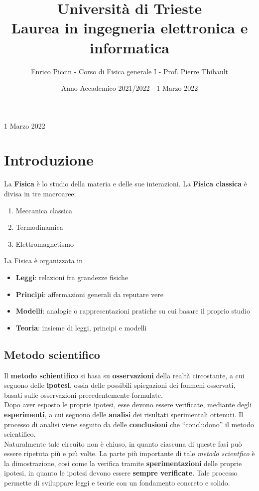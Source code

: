 \documentclass[a4paper]{extarticle}
\title{\textbf{Università di Trieste\\ \vspace{1em}
Laurea in ingegneria elettronica e informatica}}
\author{Enrico Piccin - Corso di Fisica generale I - Prof. Pierre Thibault}
\date{Anno Accademico 2021/2022 - 1 Marzo 2022}
\newcommand{\quotes}[1]{``#1''}
\begin{document}
\vspace{-10mm}
\maketitle

\tableofcontents
\newpage

\noindent
\begin{center}
  1 Marzo 2022
\end{center}

\section{Introduzione}
La \textbf{Fisica} è lo studio della materia e delle sue interazioni. La \textbf{Fisica classica} è divisa in tre macroaree:
\begin{enumerate}
  \item Meccanica classica
  \item Termodinamica
  \item Elettromagnetismo
\end{enumerate}
La Fisica è organizzata in
\begin{itemize}
  \item \textbf{Leggi}: relazioni fra grandezze fisiche
  \item \textbf{Principi}: affermazioni generali da reputare vere
  \item \textbf{Modelli}: analogie o rappresentazioni pratiche su cui basare il proprio studio
  \item \textbf{Teoria}: insieme di leggi, principi e modelli
\end{itemize}

\vspace{1em}
\subsection{Metodo scientifico}
Il \textbf{metodo schientifico} si basa su \textbf{osservazioni} della realtà circostante, a cui seguono delle \textbf{ipotesi}, ossia delle possibili spiegazioni dei fonmeni osservati, basati sulle osservazioni precedentemente formulate.\\
Dopo aver esposto le proprie ipotesi, esse devono essere verificate, mediante degli \textbf{esperimenti}, a cui seguono delle \textbf{analisi} dei risultati sperimentali ottenuti. Il processo di analisi viene seguito da delle \textbf{conclusioni} che \quotes{concludono} il metodo scientifico.\\
Naturalmente tale circuito non è chiuso, in quanto ciascuna di queste fasi può essere ripetuta più e più volte. La parte più importante di tale \emph{metodo scientfico} è la dimostrazione, così come la verifica tramite \textbf{sperimentazioni} delle proprie ipotesi, in quanto le ipotesi devono essere \textbf{sempre verificate}. Tale processo permette di sviluppare leggi e teorie con un fondamento concreto e solido.
\end{document}
